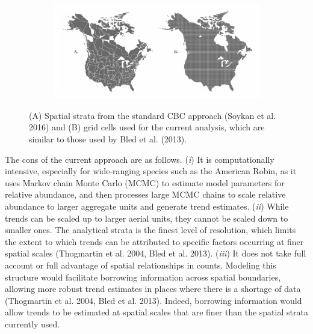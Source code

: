 \documentclass[]{article}
\begin{document}
\begin{figure}[t]
  \centering
  \begin{subfigure}[t]{0.95\textwidth}
    \centering
    \includegraphics[width=\textwidth]{different_strata} 
  \end{subfigure}
  \caption{(A) Spatial strata from the standard CBC approach (Soykan et al. 2016) and (B) grid cells used for the current analysis, which are similar to those used by Bled et al. (2013).}
\end{figure}

The cons of the current approach are as follows. (\textit{i}) It is computationally intensive, especially for wide-ranging species such as the American Robin, as it uses Markov chain Monte Carlo (MCMC) to estimate model parameters for relative abundance, and then processes large MCMC chains to scale relative abundance to larger aggregate units and generate trend estimates. (\textit{ii}) While trends can be scaled up to larger aerial units, they cannot be scaled down to smaller ones. The analytical strata is the finest level of resolution, which limits the extent to which trends can be attributed to specific factors occurring at finer spatial scales (Thogmartin et al. 2004, Bled et al. 2013). (\textit{iii}) It does not take full account or full advantage of spatial relationships in counts. Modeling this structure would facilitate borrowing information across spatial boundaries, allowing more robust trend estimates in places where there is a shortage of data (Thogmartin et al. 2004, Bled et al. 2013). Indeed, borrowing information would allow trends to be estimated at spatial scales that are finer than the spatial strata currently used.
\end{document}
